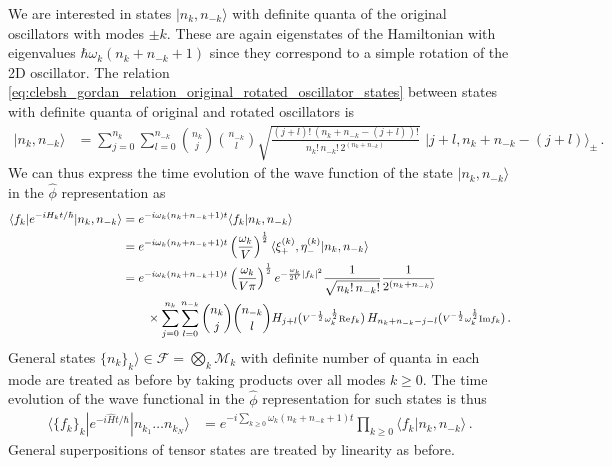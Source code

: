 \documentclass[../QFT_main.tex]{subfiles}
\begin{document}
\begin{mytheorem}
We are interested in states $|n_k, n_{-k}\rangle$ with definite quanta of the original oscillators with modes $\pm k$.
These are again eigenstates of the Hamiltonian with eigenvalues $\hbar \omega_k (n_k + n_{-k} + 1)$ since they correspond to a simple rotation of the 2D oscillator.
The relation \eqref{eq:clebsh_gordan_relation_original_rotated_oscillator_states} between states with definite quanta of original and rotated oscillators is
\begin{align}
    |n_k, n_{-k}\rangle &= \sum_{j=0}^{n_k} \sum_{l=0}^{n_{-k}} \binom{n_k}{j} \binom{n_{-k}}{l}\sqrt{\frac{(j+l)!\, (n_k + n_{-k} - (j+l))!}{n_k!\, n_{-k}!\, 2^{(n_k+n_{-k})}}}\,\,| j+l, n_k + n_{-k} - (j+l)\rangle_{\pm}\,.
\end{align}
We can thus express the time evolution of the wave function of the state $|n_k, n_{-k}\rangle$ in the $\hat{\phi}$ representation as
\begin{align}
    \langle f_k | e^{-i H_k t/\hbar} | n_k, n_{-k} \rangle 
    &= e^{-i \omega_k (n_k + n_{-k} + 1) t} \langle f_k | n_k, n_{-k} \rangle
    \\
    &=  e^{-i \omega_k (n_k + n_{-k} + 1) t} \left(\frac{\omega_k}{V}\right)^{\frac{1}{2}} \langle \xi_+^{(k)},\eta_-^{(k)} | n_k, n_{-k} \rangle
    \\
    &=  e^{-i \omega_k (n_k + n_{-k} + 1) t} \left(\frac{\omega_k}{V\pi}\right)^{\frac{1}{2}} e^{-\frac{\omega_k}{2V} |f_k|^2} \frac{1}{\sqrt{n_k!\, n_{-k}!}} \frac{1}{2^{(n_k + n_{-k})}} 
    \\
    &\qquad\times \sum_{j=0}^{n_k} \sum_{l=0}^{n_{-k}} \binom{n_k}{j} \binom{n_{-k}}{l} H_{j+l}(\text{\scriptsize $V^{-\frac{1}{2}}\omega_k^{\frac{1}{2}}\text{Re}f_k$})\, H_{n_k + n_{-k} - j-l}(\text{\scriptsize $V^{-\frac{1}{2}}\omega_k^{\frac{1}{2}}\text{Im}f_k$})\,.
\end{align}
General states $\{n_k\}_k\rangle\in\mathcal{F}=\bigotimes_k\mathcal{M}_k$ with definite number of quanta in each mode are treated as before by taking products over all modes $k\geq 0$.
The time evolution of the wave functional in the $\hat{\phi}$ representation for such states is thus
\begin{align}
    \langle \{f_k\}_k | e^{-i \hat{H} t/\hbar} | n_{k_1}\dots n_{k_N} \rangle 
    &= e^{-i \sum_{k\geq0} \omega_k (n_k + n_{-k} + 1) t} \prod_{k\geq0} \langle f_k | n_k, n_{-k} \rangle\,.
\end{align}
General superpositions of tensor states are treated by linearity as before.
%
\end{mytheorem}
\end{document}
